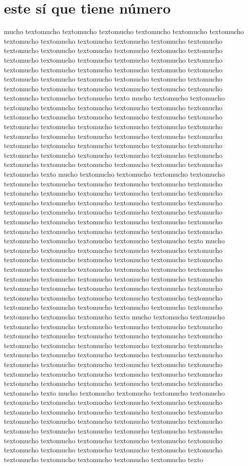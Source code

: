 \documentclass[11pt]{article}
\begin{document}
\section*{este sí que tiene número}
\label{sec:org0000003}

mucho textomucho textomucho textomucho textomucho textomucho textomucho textomucho textomucho textomucho textomucho textomucho textomucho textomucho textomucho textomucho textomucho textomucho textomucho textomucho textomucho textomucho textomucho textomucho textomucho textomucho textomucho textomucho textomucho textomucho textomucho textomucho textomucho textomucho textomucho textomucho textomucho textomucho textomucho textomucho textomucho textomucho textomucho textomucho textomucho textomucho texto
mucho textomucho textomucho textomucho textomucho textomucho textomucho textomucho textomucho textomucho textomucho textomucho textomucho textomucho textomucho textomucho textomucho textomucho textomucho textomucho textomucho textomucho textomucho textomucho textomucho textomucho textomucho textomucho textomucho textomucho textomucho textomucho textomucho textomucho textomucho textomucho textomucho textomucho textomucho textomucho textomucho textomucho textomucho textomucho textomucho textomucho texto
mucho textomucho textomucho textomucho textomucho textomucho textomucho textomucho textomucho textomucho textomucho textomucho textomucho textomucho textomucho textomucho textomucho textomucho textomucho textomucho textomucho textomucho textomucho textomucho textomucho textomucho textomucho textomucho textomucho textomucho textomucho textomucho textomucho textomucho textomucho textomucho textomucho textomucho textomucho textomucho textomucho textomucho textomucho textomucho textomucho textomucho texto
mucho textomucho textomucho textomucho textomucho textomucho textomucho textomucho textomucho textomucho textomucho textomucho textomucho textomucho textomucho textomucho textomucho textomucho textomucho textomucho textomucho textomucho textomucho textomucho textomucho textomucho textomucho textomucho textomucho textomucho textomucho textomucho textomucho textomucho textomucho textomucho textomucho textomucho textomucho textomucho textomucho textomucho textomucho textomucho textomucho textomucho texto
mucho textomucho textomucho textomucho textomucho textomucho textomucho textomucho textomucho textomucho textomucho textomucho textomucho textomucho textomucho textomucho textomucho textomucho textomucho textomucho textomucho textomucho textomucho textomucho textomucho textomucho textomucho textomucho textomucho textomucho textomucho textomucho textomucho textomucho textomucho textomucho textomucho textomucho textomucho textomucho textomucho textomucho textomucho textomucho textomucho textomucho texto
mucho textomucho textomucho textomucho textomucho textomucho textomucho textomucho textomucho textomucho textomucho textomucho textomucho textomucho textomucho textomucho textomucho textomucho textomucho textomucho textomucho textomucho textomucho textomucho textomucho textomucho textomucho textomucho textomucho textomucho textomucho textomucho textomucho textomucho textomucho textomucho textomucho textomucho textomucho textomucho textomucho textomucho textomucho textomucho textomucho textomucho texto
\end{document}
